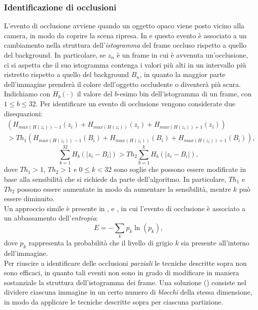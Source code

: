 \subsubsection{Identificazione di occlusioni}
L'evento di occlusione avviene quando un oggetto opaco viene posto vicino alla camera, in modo da coprire la scena ripresa.
In \cite{aksay2007camera} e \cite{saglam2009real} questo evento \`e associato a un cambiamento nella struttura dell'\textit{istogramma} del frame occluso rispetto a quello del background.
In particolare, se $z_n$ \`e un frame in cui \`e avvenuta un'occlusione, ci si aspetta che il suo istogramma contenga i valori pi\`u alti in un intervallo pi\`u ristretto rispetto a quello del background $B_n$, in quanto la maggior parte dell'immagine prender\`a il colore dell'oggetto occludente o diventer\`a pi\`u scura.\\
Indichiamo con $H_b(\cdot)$ il valore del $b$-esimo bin dell'istogramma di un frame, con $1 \leq b \leq 32$.
Per identificare un evento di occlusione vengono considerate due disequazioni:
\begin{eqnarray}
 \left(H_{max\left(H(z_i)\right)-1}(z_i) + H_{max\left(H(z_i)\right)}(z_i) +  H_{max\left(H(z_i)\right) + 1}(z_i)\right) \nonumber \\
 > Th_1 \left(H_{max\left(H(z_i)\right)-1}(B_i) + H_{max\left(H(z_i)\right)}(B_i)
  +  H_{max\left(H(z_i)\right) + 1}(B_i)\right), \nonumber
\end{eqnarray}
\[ \sum_{b=1}^{32} H_b\left(|z_i - B_i|\right) > Th_2 \sum_{b=1}^{k}H_b\left(|z_i - B_i|\right),\]
dove $Th_1 > 1$, $Th_2 > 1$ e $0 \leq k < 32$ sono soglie che possono essere modificate in base alla sensibilit\`a che si richiede da parte dell'algoritmo.
In particolare, $Th_1$ e $Th_2$ possono essere aumentate in modo da aumentare la sensibilit\`a, mentre $k$ pu\`o essere diminuito.\\
Un approccio simile \`e presente in \cite{harasse2004automated}, \cite{gil2007automatic} e \cite{ellwart2012camera}, in cui l'evento di occlusione \`e associato a un abbassamento dell'\textit{entropia}:
 \[
 \label{eq:entropy}
 E=-\sum_{k}p_k\ln(p_k) ,
 \]
 dove $p_k$ rappresenta la probabilit\`a che il livello di grigio $k$ sia presente all'interno dell'immagine. \\
 Per riuscire a identificare delle occlusioni \textit{parziali} le tecniche descritte sopra non sono efficaci, in quanto tali eventi non sono in grado di modificare in maniera sostanziale la struttura dell'istogramma dei frame.
 Una soluzione (\cite{gil2007automatic}) consiste nel dividere ciascuna immagine in un certo numero di \textit{blocchi} della stessa dimensione, in modo da applicare le tecniche descritte sopra per ciascuna partizione.
